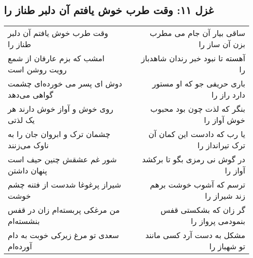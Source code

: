 \begin{center}
\section*{غزل ۱۱: وقت طرب خوش یافتم آن دلبر طناز را}
\label{sec:011}
\begin{longtable}{l p{0.5cm} r}
وقت طرب خوش یافتم آن دلبر طناز را
&&
ساقی بیار آن جام می مطرب بزن آن ساز را
\\
امشب که بزم عارفان از شمع رویت روشن است
&&
آهسته تا نبود خبر رندان شاهدباز را
\\
دوش ای پسر می خورده‌ای چشمت گواهی می‌دهد
&&
باری حریفی جو که او مستور دارد راز را
\\
روی خوش و آواز خوش دارند هر یک لذتی
&&
بنگر که لذت چون بود محبوب خوش آواز را
\\
چشمان ترک و ابروان جان را به ناوک می‌زنند
&&
یا رب که دادست این کمان آن ترک تیرانداز را
\\
شور غم عشقش چنین حیف است پنهان داشتن
&&
در گوش نی رمزی بگو تا برکشد آواز را
\\
شیراز پرغوغا شدست از فتنه چشم خوشت
&&
ترسم که آشوب خوشت برهم زند شیراز را
\\
من مرغکی پربسته‌ام زان در قفس بنشسته‌ام
&&
گر زان که بشکستی قفس بنمودمی پرواز را
\\
سعدی تو مرغ زیرکی خوبت به دام آورده‌ام
&&
مشکل به دست آرد کسی مانند تو شهباز را
\\
\end{longtable}
\end{center}
